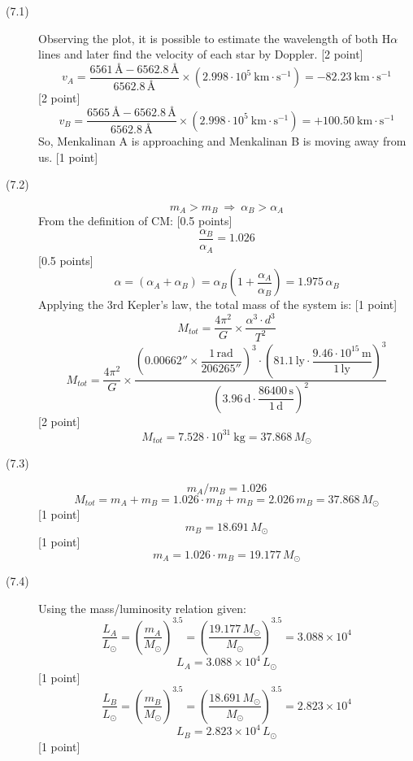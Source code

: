 
\begin{description}
\item[(7.1)] Observing the plot, it is possible to estimate the wavelength of
  both H$\alpha$ lines and later find the velocity of each star by Doppler.
  \hfill[2 point]
  \[ v_A = \frac{6561\,\text{\AA} - 6562.8\,\text{\AA}}{6562.8\,\text{\AA}}
     \times\left(2.998\cdot 10^5\ \mathrm{km\cdot s^{-1}}\right)
     = -82.23\ \mathrm{km\cdot s^{-1}} \]
  \hfill[2 point]
  \[ v_B = \frac{6565\,\text{\AA} - 6562.8\,\text{\AA}}{6562.8\,\text{\AA}}
     \times\left(2.998\cdot 10^5\ \mathrm{km\cdot s^{-1}}\right)
     = +100.50\ \mathrm{km\cdot s^{-1}} \]
  So, Menkalinan A is approaching and Menkalinan B is moving away from us.
  \hfill[1 point]
\item[(7.2)]
  \[ m_A > m_B \ \Rightarrow\ \alpha_B > \alpha_A \]
  From the definition of CM: \hfill[0.5 points]
  \[ \frac{\alpha_B}{\alpha_A} = 1.026 \]
  \hfill[0.5 points]
  \[ \alpha = (\alpha_A + \alpha_B)
     = \alpha_B\left(1 + \frac{\alpha_A}{\alpha_B}\right)
     = 1.975\,\alpha_B \]
  Applying the 3rd Kepler's law, the total mass of the system is:
  \hfill[1 point]
  \[ M_{tot} = \frac{4\pi^2}{G}\times\frac{\alpha^3\cdot d^3}{T^2} \]
  \[ M_{tot} = \frac{4\pi^2}{G}\times
     \frac{\left(0.00662''\times\dfrac{1\,\mathrm{rad}}{206265''}\right)^3
       \cdot\left(81.1\,\mathrm{ly}\cdot
       \dfrac{9.46\cdot 10^{15}\,\mathrm{m}}{1\,\mathrm{ly}}\right)^3}
     {\left(3.96\,\mathrm{d}\cdot
       \dfrac{86400\,\mathrm{s}}{1\,\mathrm{d}}\right)^2} \]
  \hfill[2 point]
  \[ M_{tot} = 7.528\cdot 10^{31}\ \mathrm{kg} = 37.868\,M_\odot \]
\item[(7.3)]
  \[ m_A/m_B = 1.026 \]
  \[ M_{tot} = m_A + m_B = 1.026\cdot m_B + m_B = 2.026\,m_B
     = 37.868\,M_\odot \]
  \hfill[1 point]
  \[ m_B = 18.691\,M_\odot \]
  \hfill[1 point]
  \[ m_A = 1.026\cdot m_B = 19.177\,M_\odot \]
\item[(7.4)] Using the mass/luminosity relation given:
  \[ \frac{L_A}{L_\odot} = \left(\frac{m_A}{M_\odot}\right)^{3.5}
     = \left(\frac{19.177\,M_\odot}{M_\odot}\right)^{3.5}
     = 3.088\times 10^4 \]
  \[ L_A = 3.088\times 10^4\,L_\odot \]
  \hfill[1 point]
  \[ \frac{L_B}{L_\odot} = \left(\frac{m_B}{M_\odot}\right)^{3.5}
     = \left(\frac{18.691\,M_\odot}{M_\odot}\right)^{3.5}
     = 2.823\times 10^4 \]
  \[ L_B = 2.823\times 10^4\,L_\odot \]
  \hfill[1 point]
\end{description}
